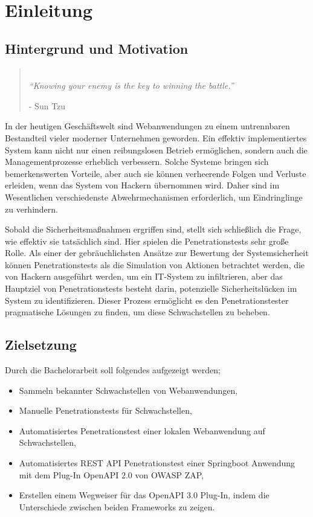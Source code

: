 \chapter{Einleitung}
\label{cha:Einleitung}

\section{Hintergrund und Motivation}

\begin{quote}
	\begin{center}
		\emph{\\
			"`Knowing your enemy is the key to winning the battle."'}
	\end{center}
	\begin{flushright}
		- Sun Tzu
	\end{flushright}
\end{quote}

In der heutigen Geschäftswelt sind Webanwendungen zu einem untrennbaren Bestandteil vieler moderner Unternehmen geworden. Ein effektiv implementiertes System kann nicht nur einen reibungslosen Betrieb ermöglichen, sondern auch die Managementprozesse erheblich verbessern. Solche Systeme bringen sich bemerkenswerten Vorteile, aber auch sie können verheerende Folgen und Verluste erleiden, wenn das System von Hackern übernommen wird. Daher sind im Wesentlichen verschiedenste Abwehrmechanismen erforderlich, um Eindringlinge zu verhindern.

Sobald die Sicherheitsmaßnahmen ergriffen sind, stellt sich schließlich die Frage, wie effektiv sie tatsächlich sind. Hier spielen die Penetrationstests sehr große Rolle. Als einer der gebräuchlichsten Ansätze zur Bewertung der Systemsicherheit können Penetrationstests als die Simulation von Aktionen betrachtet werden, die von Hackern ausgeführt werden, um ein IT-System zu infiltrieren, aber das Hauptziel von Penetrationstests besteht darin, potenzielle Sicherheitslücken im System zu identifizieren. Dieser Prozess ermöglicht es den Penetrationstester pragmatische Lösungen zu finden, um diese Schwachstellen zu beheben.

\section{Zielsetzung}

Durch die Bachelorarbeit soll folgendes aufgezeigt werden;

\begin{itemize}
	\item Sammeln bekannter Schwachstellen von Webanwendungen,
	\item Manuelle Penetrationstests für Schwachstellen,
	\item Automatisiertes Penetrationstest einer lokalen Webanwendung auf Schwachstellen,
	\item Automatisiertes REST API Penetrationstest einer Springboot Anwendung mit dem Plug-In OpenAPI 2.0 von OWASP ZAP,
	\item Erstellen einem Wegweiser für das OpenAPI 3.0 Plug-In, indem die Unterschiede zwischen beiden Frameworks zu zeigen.\\
\end{itemize}


